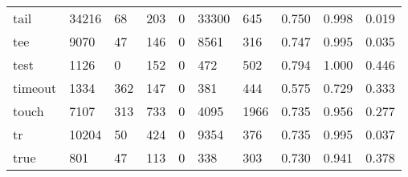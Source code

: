 \begin{longtable}{lp{1.3cm}p{1.3cm}p{1.3cm}p{1.3cm}p{1.3cm}p{1.3cm}p{1.3cm}p{1.3cm}p{1.3cm}}
tail      &                  34216 &                                 68 &                               203 &                                0 &                             33300 &                             645 &                                   0.750 &                                  0.998 &                                0.019 \\
tee       &                   9070 &                                 47 &                               146 &                                0 &                              8561 &                             316 &                                   0.747 &                                  0.995 &                                0.035 \\
test      &                   1126 &                                  0 &                               152 &                                0 &                               472 &                             502 &                                   0.794 &                                  1.000 &                                0.446 \\
timeout   &                   1334 &                                362 &                               147 &                                0 &                               381 &                             444 &                                   0.575 &                                  0.729 &                                0.333 \\
touch     &                   7107 &                                313 &                               733 &                                0 &                              4095 &                            1966 &                                   0.735 &                                  0.956 &                                0.277 \\
tr        &                  10204 &                                 50 &                               424 &                                0 &                              9354 &                             376 &                                   0.735 &                                  0.995 &                                0.037 \\
true      &                    801 &                                 47 &                               113 &                                0 &                               338 &                             303 &                                   0.730 &                                  0.941 &                                0.378 \\

\end{longtable}
